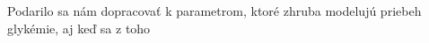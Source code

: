 \documentclass[11pt]{article} %
\begin{document}
Podarilo sa nám dopracovať k parametrom, ktoré zhruba modelujú priebeh glykémie, aj keď sa z toho





%
%
%
%
%
%
%
\end{document}
